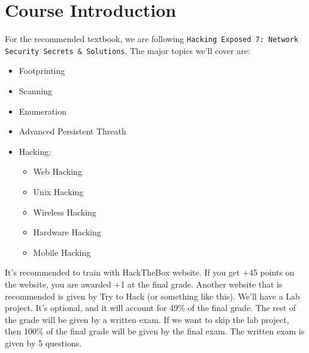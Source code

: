 
\section{Course Introduction}
For the recommended textbook, we are following \newline
\texttt{Hacking Exposed 7: Network Security Secrets \&
Solutions}.  \newline
\newline The major topics we'll cover are:
\begin{itemize}
    \item Footprinting
    \item Scanning
    \item Enumeration
    \item Advanced Persistent Threath
    \item Hacking: \begin{itemize}
        \item Web Hacking
        \item Unix Hacking
        \item Wireless Hacking
        \item Hardware Hacking 
        \item Mobile Hacking
    \end{itemize}
\end{itemize}


It's recommended to train with HackTheBox website. If 
you get +45 points on the website, you are awarded +1
at the final grade. Another website that is  recommended
is given by Try to Hack (or something like this). \newline
\newline We'll have a Lab project. It's optional, and 
it will account for 49\% of the final grade. The rest 
of the grade will be given by a written exam. If we 
want to skip the lab project, then 100\% of the final 
grade will be given by the final exam. The written exam 
is given by 5 questions. 

